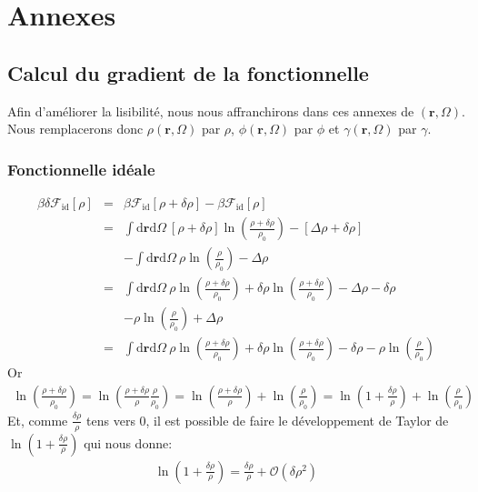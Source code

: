\appendix

\part*{Annexes}

\chapter{Calcul du gradient de la fonctionnelle}
Afin d'améliorer la lisibilité, nous nous affranchirons dans ces annexes de $(\boldsymbol{r},\Omega)$. Nous remplacerons donc $\rho(\boldsymbol{r},\Omega)$ par $\rho$, $\phi(\boldsymbol{r},\Omega)$ par $\phi$ et $\gamma(\boldsymbol{r},\Omega)$ par $\gamma$.
\label{chap:annexes:grad}

\section{Fonctionnelle idéale}
\label{sec:annexes:grad:id}
\begin{eqnarray}
\beta \delta \mathcal{F}_\mathrm{id}[\rho] &=& \beta \mathcal{F}_\mathrm{id}[\rho + \delta \rho] -\beta \mathcal{F}_\mathrm{id}[\rho] \\
&=& \int\mathrm{d}\boldsymbol{r}\mathrm{d}\Omega\ [\rho + \delta \rho]\ln(\frac{\rho + \delta \rho}{\rho_0})- [\Delta\rho + \delta \rho] \\
& & - \int\mathrm{d}\boldsymbol{r}\mathrm{d}\Omega\ \rho\ln(\frac{\rho}{\rho_0})-\Delta\rho \nonumber \\
&=& \int\mathrm{d}\boldsymbol{r}\mathrm{d}\Omega\ \rho \ln(\frac{\rho + \delta \rho}{\rho_0}) + \delta \rho\ln(\frac{\rho + \delta \rho}{\rho_0}) - \Delta\rho - \delta\rho \\
& & - \rho\ln(\frac{\rho}{\rho_0}) + \Delta\rho \nonumber \\
&=& \int\mathrm{d}\boldsymbol{r}\mathrm{d}\Omega\ \rho \ln(\frac{\rho + \delta \rho}{\rho_0}) + \delta \rho\ln(\frac{\rho + \delta \rho}{\rho_0}) - \delta\rho - \rho\ln(\frac{\rho}{\rho_0})\nonumber
\end{eqnarray}
Or
\begin{eqnarray}
\ln(\frac{\rho + \delta \rho}{\rho_0}) = \ln(\frac{\rho + \delta \rho}{\rho}\frac{\rho}{\rho_0}) = \ln(\frac{\rho + \delta \rho}{\rho})+\ln(\frac{\rho}{\rho_0}) = \ln(1+\frac{\delta \rho}{\rho})+\ln(\frac{\rho}{\rho_0})
\end{eqnarray}
Et, comme $\frac{\delta \rho}{\rho}$ tens vers 0, il est possible de faire le développement de Taylor de $\ln(1+\frac{\delta \rho}{\rho})$ qui nous donne:
\begin{eqnarray}
\ln(1+\frac{\delta \rho}{\rho}) = \frac{\delta \rho}{\rho} + \mathcal{O}(\delta\rho^{2})
\end{eqnarray}

